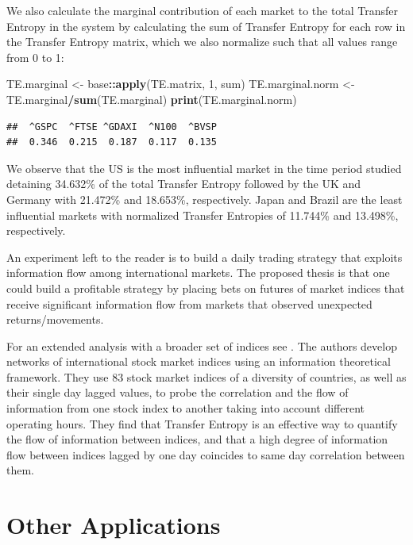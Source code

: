 \documentclass[]{book}
\newenvironment{Shaded}{\begin{snugshade}}{\end{snugshade}}
\newcommand{\KeywordTok}[1]{\textcolor[rgb]{0.13,0.29,0.53}{\textbf{#1}}}
\newcommand{\DecValTok}[1]{\textcolor[rgb]{0.00,0.00,0.81}{#1}}
\newcommand{\StringTok}[1]{\textcolor[rgb]{0.31,0.60,0.02}{#1}}
\newcommand{\OperatorTok}[1]{\textcolor[rgb]{0.81,0.36,0.00}{\textbf{#1}}}
\newcommand{\NormalTok}[1]{#1}
\theoremstyle{definition}
\theoremstyle{definition}
\theoremstyle{definition}
\theoremstyle{remark}
\begin{document}
We also calculate the marginal contribution of each market to the total
Transfer Entropy in the system by calculating the sum of Transfer
Entropy for each row in the Transfer Entropy matrix, which we also
normalize such that all values range from 0 to 1:

\begin{Shaded}
\begin{Highlighting}[]
\NormalTok{TE.marginal <-}\StringTok{ }\NormalTok{base}\OperatorTok{::}\KeywordTok{apply}\NormalTok{(TE.matrix, }\DecValTok{1}\NormalTok{, sum)}
\NormalTok{TE.marginal.norm <-}\StringTok{ }\NormalTok{TE.marginal}\OperatorTok{/}\KeywordTok{sum}\NormalTok{(TE.marginal)}
\KeywordTok{print}\NormalTok{(TE.marginal.norm)}
\end{Highlighting}
\end{Shaded}

\begin{verbatim}
##  ^GSPC  ^FTSE ^GDAXI  ^N100  ^BVSP 
##  0.346  0.215  0.187  0.117  0.135
\end{verbatim}

We observe that the US is the most influential market in the time period
studied detaining 34.632\% of the total Transfer Entropy followed by the
UK and Germany with 21.472\% and 18.653\%, respectively. Japan and
Brazil are the least influential markets with normalized Transfer
Entropies of 11.744\% and 13.498\%, respectively.

An experiment left to the reader is to build a daily trading strategy
that exploits information flow among international markets. The proposed
thesis is that one could build a profitable strategy by placing bets on
futures of market indices that receive significant information flow from
markets that observed unexpected returns/movements.

For an extended analysis with a broader set of indices see
\citep{junior2015dependency}. The authors develop networks of
international stock market indices using an information theoretical
framework. They use 83 stock market indices of a diversity of countries,
as well as their single day lagged values, to probe the correlation and
the flow of information from one stock index to another taking into
account different operating hours. They find that Transfer Entropy is an
effective way to quantify the flow of information between indices, and
that a high degree of information flow between indices lagged by one day
coincides to same day correlation between them.

\section{Other Applications}\label{other-applications}
\end{document}
